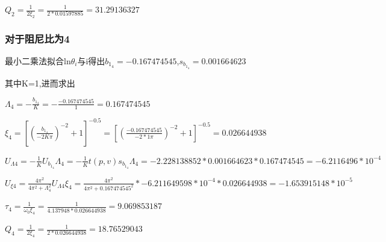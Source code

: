 \documentclass[UTF8]{ctexart}
\begin{document}
        $Q_{2}=\frac{1}{2\xi_{2}}=\frac{1}{2*0.01597885}=31.29136327$
        \subsubsection{对于阻尼比为4}

        最小二乘法拟合ln$\theta_{i}$与i得出$b_{1_{4}}=-0.167474545$,\quad $s_{b_{1_{4}}}=0.001664623$

        其中K=1,进而求出

        $\Lambda_{4}=-\frac{b_{1_{4}}}{K}=-\frac{-0.167474545}{1}=0.167474545$

        $\xi_{4}=[(\frac{b_{1_{4}}}{-2K\pi})^{-2}+1]^{-0.5}=[(\frac{-0.167474545}{-2*1\pi})^{-2}+1]^{-0.5}=0.026644938$

        $U_{\Lambda 4}=-\frac{1}{K}U_{b_{1_{4}}}\Lambda_{4}=-\frac{1}{K}t(p,v)s_{b_{1_{4}}}\Lambda_{4}=-2.228138852*0.001664623*0.167474545=-6.2116496*10^{-4}$

        $U_{\xi 4}=\frac{4\pi^{2}}{4\pi^{2}+\Lambda_{4}^2}U_{\Lambda 4}\xi_{4}=\frac{4\pi^{2}}{4\pi^{2}+0.167474545^{2}}*-6.211649598*10^{-4}*0.026644938=-1.653915148*10^{-5}$

        $\tau_{4}=\frac{1}{\omega_{0}\xi_{4}}=\frac{1}{4.137948*0.026644938}=9.069853187$

        $Q_{4}=\frac{1}{2\xi_{4}}=\frac{1}{2*0.026644938}=18.76529043$

\end{document}
